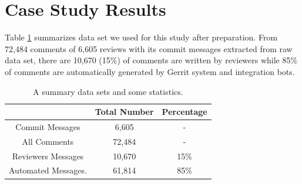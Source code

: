 \documentclass[conference]{IEEEtran}
\begin{document}
%
%
%
%
%


\section{Case Study Results}
Table \ref{tb:datastatistic} summarizes data set we used for this study after preparation.
From 72,484 comments of 6,605 reviews with its commit messages extracted from raw data set, there are 10,670 (15\%) of comments are written by reviewers while 85\% of comments are automatically generated by Gerrit system and integration bots.  

\begin{table}[!h]
\caption{A summary data sets and some statistics.}
\centering
\small
\begin{tabular}{ccc}
\hline
& Total Number & Percentage \\ \hline \hline
Commit Messages & 6,605 &  -  \\ \hline
All Comments & 72,484& - \\ \hline
Reviewers Messages & 10,670 & 15\% \\ \hline
Automated Messages. & 61,814 & 85\% \\ \hline 

\end{tabular}
\label{tb:datastatistic}
\end{table}
\end{document}
